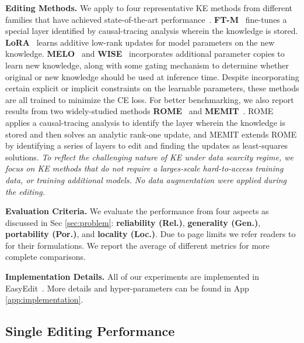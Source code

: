 \textbf{Editing Methods.}
We apply {\NAME} to four representative KE methods from different families that have achieved state-of-the-art performance~\citep{zhang2024comprehensive, wang2024easyedit}.
\textbf{FT-M}~\citep{zhang2024comprehensive}
fine-tunes a special layer identified by causal-tracing analysis wherein the knowledge is stored.
\textbf{LoRA}~\citep{hu2021lora}
learns additive low-rank updates for model parameters on the new knowledge. 
\textbf{MELO}~\citep{yu2024melo} and \textbf{WISE}~\citep{wang2024wise} 
incorporates additional parameter copies to learn new knowledge, along with some gating mechanism to determine whether original or new knowledge should be used at inference time.
Despite incorporating certain explicit or implicit constraints on the learnable parameters, these methods are all trained to minimize the CE loss.  
For better benchmarking, we also report results from two widely-studied methods \textbf{ROME}~\citep{meng2022locating} and \textbf{MEMIT}~\citep{meng2022mass}.
ROME applies a causal-tracing analysis to identify the layer wherein the knowledge is stored and then solves an analytic rank-one update,
and 
MEMIT extends ROME by identifying a series of layers to edit and finding the updates as least-squares solutions. 
\textit{To reflect the challenging nature of KE under data scarcity regime, 
we focus on KE methods that {do not require a larges-scale hard-to-access training data, or training additional models}. 
No data augmentation were applied during the editing.}



\textbf{Evaluation Criteria.}
We evaluate the performance from four aspects as discussed in Sec \ref{sec:problem}: \textbf{reliability (Rel.)}, \textbf{generality (Gen.)}, \textbf{portability (Por.)}, and \textbf{locality (Loc.)}.
Due to page limits we refer readers to \citet{zhang2024comprehensive, wang2024wise} for their formulations. 
We report the average of different metrics for more complete comparisons. 



\textbf{Implementation Details.}
All of our experiments are implemented in EasyEdit~\citep{wang2024easyedit}.
More details and hyper-parameters can be found in App \ref{app:implementation}.




\subsection{Single Editing Performance}
\label{sec:exp:single}

